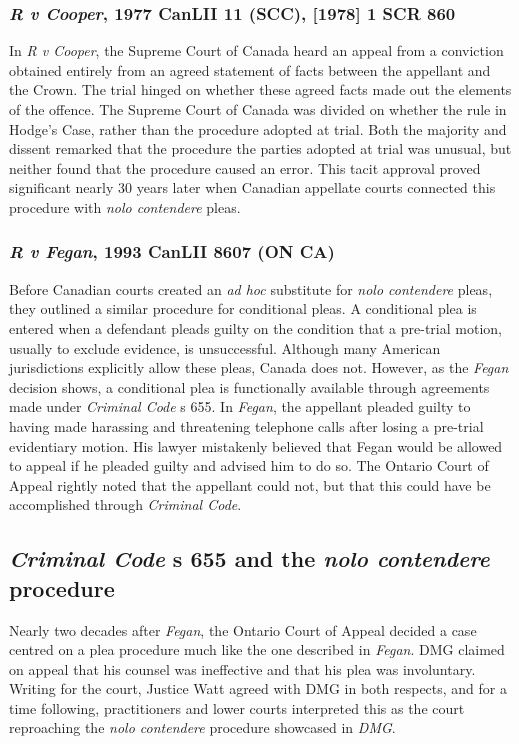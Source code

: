 \subsubsection{\textit{R v Cooper}, 1977 CanLII 11 (SCC), [1978] 1 SCR 860}

In \textit{R v Cooper}, the Supreme Court of Canada heard an appeal from a conviction obtained entirely from an agreed statement of facts between the appellant and the Crown. The trial hinged on whether these agreed facts made out the elements of the offence. The Supreme Court of Canada was divided on whether the rule in Hodge's Case, rather than the procedure adopted at trial. Both the majority and dissent remarked that the procedure the parties adopted at trial was unusual, but neither found that the procedure caused an error. This tacit approval proved significant nearly 30 years later when Canadian appellate courts connected this procedure with \textit{nolo contendere} pleas.

\subsubsection{\textit{R v Fegan}, 1993 CanLII 8607 (ON CA)}

Before Canadian courts created an \textit{ad hoc} substitute for \textit{nolo contendere} pleas, they outlined a similar procedure for conditional pleas. A conditional plea is entered when a defendant pleads guilty on the condition that a pre-trial motion, usually to exclude evidence, is unsuccessful. Although many American jurisdictions explicitly allow these pleas, Canada does not. However, as the \textit{Fegan} decision shows, a conditional plea is functionally available through agreements made under \textit{Criminal Code} s 655. In \textit{Fegan}, the appellant pleaded guilty to having made harassing and threatening telephone calls after losing a pre-trial evidentiary motion. His lawyer mistakenly believed that Fegan would be allowed to appeal if he pleaded guilty and advised him to do so. The Ontario Court of Appeal rightly noted that the appellant could not, but that this could have be accomplished through \textit{Criminal Code}.

\subsection{\textit{Criminal Code} s 655 and the \textit{nolo contendere} procedure}

Nearly two decades after \textit{Fegan}, the Ontario Court of Appeal decided a case centred on a plea procedure much like the one described in \textit{Fegan}. DMG claimed on appeal that his counsel was ineffective and that his plea was involuntary. Writing for the court, Justice Watt agreed with DMG in both respects, and for a time following, practitioners and lower courts interpreted this as the court reproaching the \textit{nolo contendere} procedure showcased in \textit{DMG}.

